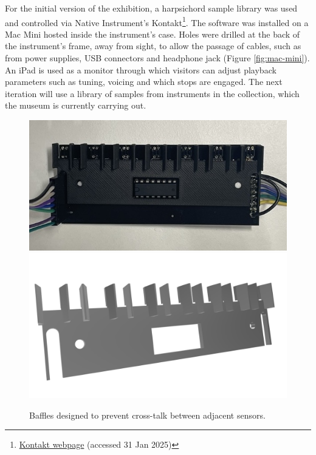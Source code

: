 For the initial version of the exhibition, a harpsichord sample library was used and controlled via Native Instrument's Kontakt\footnote{\href{https://www.native-instruments.com/en/products/komplete/samplers/kontakt-8/?srsltid=AfmBOorKUf43SoIxGBS2-GnXmKHHkgcfcfWRskpweDhLSG3FiF0qrf2w}{Kontakt webpage} (accessed 31 Jan 2025)}. The software was installed on a Mac Mini hosted inside the instrument's case. Holes were drilled at the back of the instrument's frame, away from sight, to allow the passage of cables, such as from power supplies, USB connectors and headphone jack (Figure \ref{fig:mac-mini}). 
An iPad is used as a monitor through which visitors can adjust playback parameters such as tuning, voicing and which stops are engaged. The next iteration will use a library of samples from instruments in the collection, which the museum is currently carrying out.

\begin{figure}[!b]
    \centering
    \includegraphics[width=\linewidth]{src/images/sensor-board-w-baffles.jpeg}
    \\
    \includegraphics[width=0.8\linewidth]{src/images/baffles.png}
    \caption{Baffles designed to prevent cross-talk between adjacent sensors.}
    \Description{}
    \label{fig:baffles}
\end{figure}





